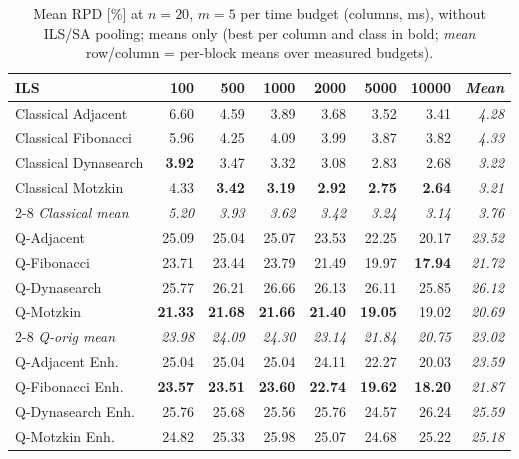 \documentclass[preprint,12pt,authoryear]{elsarticle}
\begin{document}
\begin{table}[!tp]
\centering
\caption{Mean RPD [\%] at $n = 20$, $m = 5$ per time budget (columns,
  ms), without ILS/SA pooling; means only (best per column and class
  in bold; \emph{mean} row/column = per-block means over measured
  budgets).}
\label{tab:rpd_n20_tl}
\footnotesize
\renewcommand{\arraystretch}{0.95}
\begin{tabular}{@{}lrrrrrr@{\quad}r@{}}
\toprule
ILS & 100 & 500 & 1000 & 2000 & 5000 & 10000 & \emph{Mean} \\
\midrule
Classical Adjacent   &  6.60 &  4.59 &  3.89 &  3.68 &  3.52 &  3.41 & \emph{4.28} \\
Classical Fibonacci  &  5.96 &  4.25 &  4.09 &  3.99 &  3.87 &  3.82 & \emph{4.33} \\
Classical Dynasearch &  \textbf{3.92} &  3.47 &  3.32 &  3.08 &  2.83 &  2.68 & \emph{3.22} \\
Classical Motzkin    &  4.33 &  \textbf{3.42} &  \textbf{3.19} &  \textbf{2.92} &  \textbf{2.75} &  \textbf{2.64} & \emph{3.21} \\
\cmidrule(l){2-8}
\emph{Classical mean} & \emph{5.20} & \emph{3.93} & \emph{3.62} & \emph{3.42} & \emph{3.24} & \emph{3.14} & \emph{3.76} \\
\midrule
Q-Adjacent           & 25.09 & 25.04 & 25.07 & 23.53 & 22.25 & 20.17 & \emph{23.52} \\
Q-Fibonacci          & 23.71 & 23.44 & 23.79 & 21.49 & 19.97 & \textbf{17.94} & \emph{21.72} \\
Q-Dynasearch         & 25.77 & 26.21 & 26.66 & 26.13 & 26.11 & 25.85 & \emph{26.12} \\
Q-Motzkin            & \textbf{21.33} & \textbf{21.68} & \textbf{21.66} & \textbf{21.40} & \textbf{19.05} & 19.02 & \emph{20.69} \\
\cmidrule(l){2-8}
\emph{Q-orig mean}   & \emph{23.98} & \emph{24.09} & \emph{24.30} & \emph{23.14} & \emph{21.84} & \emph{20.75} & \emph{23.02} \\
\midrule
Q-Adjacent Enh.      & 25.04 & 25.04 & 25.04 & 24.11 & 22.27 & 20.03 & \emph{23.59} \\
Q-Fibonacci Enh.     & \textbf{23.57} & \textbf{23.51} & \textbf{23.60} & \textbf{22.74} & \textbf{19.62} & \textbf{18.20} & \emph{21.87} \\
Q-Dynasearch Enh.    & 25.76 & 25.68 & 25.56 & 25.76 & 24.57 & 26.24 & \emph{25.59} \\
Q-Motzkin Enh.       & 24.82 & 25.33 & 25.98 & 25.07 & 24.68 & 25.22 & \emph{25.18} \\

\end{tabular}
\end{table}
\end{document}
